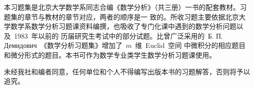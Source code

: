 

\begin{summary}
本习题集是北京大学数学系同志合编《数学分析》（共三册）一书的配套教材。习题集的章节与教材的章节对应，两者的顺序是一
致的。所收习题主要依据北京大学数学系数学分析习题课资料编撰，也吸收了专门化课中遇到的数学分析问题以及~1983~年以前的
历届研究生考试中的部分试题。比曾广泛采用的~Б. П. Демидович~《数学分析习题集》增加了~$m$~维~Euclid~空间
中微积分的相应题目和微分形式的题目。本书可作为数学专业类学生数学分析习题课使用。

未经我社和编者同意，任何单位和个人不得编写出版本书的习题解答，否则将予以追究。
\end{summary}

\MakeVolume

\volfrontmatter



\VolumeTOC

\endinput
